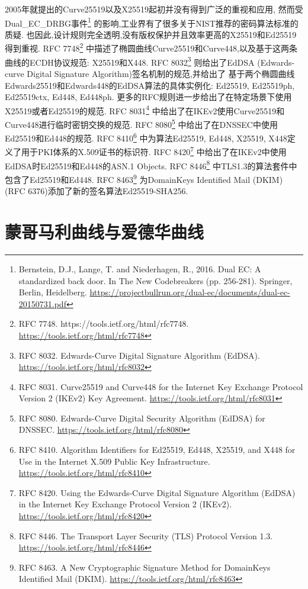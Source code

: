 \documentclass{article}
\begin{document}
2005年就提出的Curve25519以及X25519起初并没有得到广泛的重视和应用,
然而受Dual_EC_DRBG事件\footnote{
Bernstein, D.J., Lange, T. and Niederhagen, R., 2016. Dual EC: A standardized back door. In The New Codebreakers (pp. 256-281). Springer, Berlin, Heidelberg.
\url{https://projectbullrun.org/dual-ec/documents/dual-ec-20150731.pdf}}
的影响,工业界有了很多关于NIST推荐的密码算法标准的质疑.
也因此,设计规则完全透明,没有版权保护并且效率更高的X25519和Ed25519得到重视.
RFC 7748\footnote{
RFC 7748. https://tools.ietf.org/html/rfc7748.
\url{https://tools.ietf.org/html/rfc7748}
}
中描述了椭圆曲线Curve25519和Curve448,以及基于这两条曲线的ECDH协议规范: X25519和X448.
RFC 8032\footnote{
RFC 8032. Edwards-Curve Digital Signature Algorithm (EdDSA).
\url{https://tools.ietf.org/html/rfc8032}
}
则给出了EdDSA (Edwards-curve Digital Signature Algorithm)签名机制的规范,并给出了
基于两个椭圆曲线Edwards25519和Edwards448的EdDSA算法的具体实例化: 
Ed25519, Ed25519ph, Ed25519ctx, Ed448, Ed448ph.
更多的RFC规则进一步给出了在特定场景下使用X25519或者Ed25519的规范.
RFC 8031\footnote{
RFC 8031. Curve25519 and Curve448 for the Internet Key Exchange Protocol Version 2 (IKEv2) Key Agreement. 
\url{https://tools.ietf.org/html/rfc8031}
}
中给出了在IKEv2使用Curve25519和Curve448进行临时密钥交换的规范.
RFC 8080\footnote{
RFC 8080. Edwards-Curve Digital Security Algorithm (EdDSA) for DNSSEC. 
\url{https://tools.ietf.org/html/rfc8080}
}
中给出了在DNSSEC中使用Ed25519和Ed448的规范.
RFC 8410\footnote{
RFC 8410. Algorithm Identifiers for Ed25519, Ed448, X25519, and X448 for Use in the Internet X.509 Public Key Infrastructure.
\url{https://tools.ietf.org/html/rfc8410}
}
中为算法Ed25519, Ed448, X25519, X448定义了用于PKI体系的X.509证书的标识符.
RFC 8420\footnote{
RFC 8420. Using the Edwards-Curve Digital Signature Algorithm (EdDSA) in the Internet Key Exchange Protocol Version 2 (IKEv2).
\url{https://tools.ietf.org/html/rfc8420}
}
中给出了在IKEv2中使用EdDSA时Ed25519和Ed448的ASN.1 Objects.
RFC 8446\footnote{
RFC 8446. The Transport Layer Security (TLS) Protocol Version 1.3.
\url{https://tools.ietf.org/html/rfc8446}
}
中TLS1.3的算法套件中包含了Ed25519和Ed448.
RFC 8463\footnote{
RFC 8463. A New Cryptographic Signature Method for DomainKeys Identified Mail (DKIM).
\url{https://tools.ietf.org/html/rfc8463}
}
为DomainKeys Identified Mail (DKIM) (RFC 6376)添加了新的签名算法Ed25519-SHA256.

\section{蒙哥马利曲线与爱德华曲线}
\end{document}
